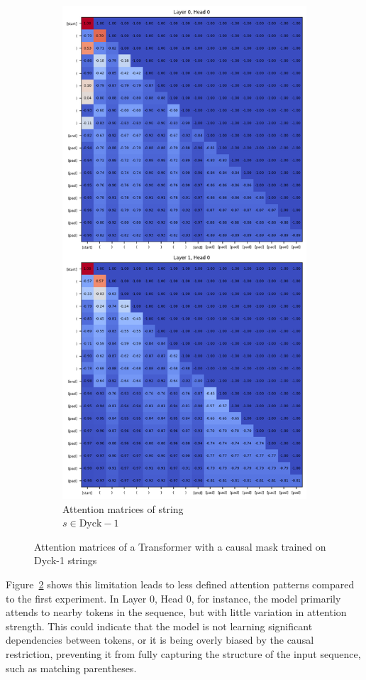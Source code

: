\begin{figure}[h]
\begin{subfigure}{.5\textwidth}
      \includegraphics[width=.8\linewidth]{docs/figs/dyck_1/causal_seq_2_dyck_1.png}
      \caption{Attention matrices of string \\ $s \in \text{Dyck}-1$}
      \label{fig:pos-causal-dyck-1}
    \end{subfigure}
    \caption{Attention matrices of a Transformer with a causal mask trained on Dyck-1 strings}
    \label{fig:causal-dyck-1}
\end{figure}

Figure~\ref{fig:causal-dyck-1} shows this limitation leads to less defined attention patterns compared to the first experiment. In Layer 0, Head 0, for instance, the model primarily attends to nearby tokens in the sequence, but with little variation in attention strength. This could indicate that the model is not learning significant dependencies between tokens, or it is being overly biased by the causal restriction, preventing it from fully capturing the structure of the input sequence, such as matching parentheses.

